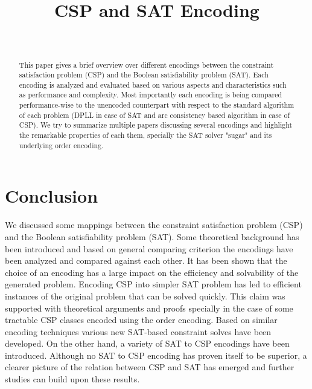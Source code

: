\documentclass[compsoc,onecolumn,11pt,a4paper,final]{IEEEtran}
\title{CSP and SAT Encoding}
\author{ 
	\IEEEauthorblockN{Mazen Bouchur}\\
	\IEEEauthorblockA{TU Clausthal, Germany}
}
\begin{document}
\maketitle
	
\begin{abstract}\label{abstract}
This paper gives a brief overview over different encodings between the constraint satisfaction problem (CSP) and the Boolean satisfiability problem (SAT). 
Each encoding is analyzed and evaluated based on various aspects and characteristics such as performance and complexity. 
Most importantly each encoding is being compared performance-wise to the unencoded counterpart with respect to the standard algorithm of each problem (DPLL in case of SAT and arc consistency based algorithm in case of CSP).
We try to summarize multiple papers discussing several encodings and highlight the remarkable properties of each them, specially the SAT solver "sugar" and its underlying order encoding.
\end{abstract}






\section{Conclusion}\label{sec:conclusion}
We discussed some mappings between the constraint satisfaction problem (CSP) and the Boolean satisfiability problem (SAT). Some theoretical background has been introduced and based on general comparing criterion the encodings have been analyzed and compared against each other. It has been shown that the choice of an encoding has a large impact on the efficiency and solvability of the generated problem. Encoding CSP into simpler SAT problem has led to efficient instances of the original problem that can be solved quickly. This claim was supported with theoretical arguments and proofs specially in the case of some tractable CSP classes encoded using the order encoding. Based on similar encoding techniques various new SAT-based constraint solves have been developed. On the other hand, a variety of SAT to CSP encodings have been introduced. Although no SAT to CSP encoding has proven itself to be superior, a clearer picture of the relation between CSP and SAT has emerged and further studies can build upon these results.

\newpage
\nocite{*}


\end{document}
